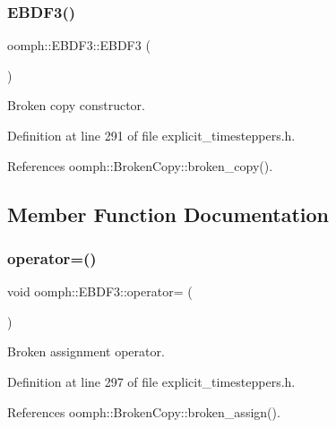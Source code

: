 \subsubsection{\texorpdfstring{E\+B\+D\+F3()}{EBDF3()}\hspace{0.1cm}{\footnotesize\ttfamily [2/2]}}
{\footnotesize\ttfamily oomph\+::\+E\+B\+D\+F3\+::\+E\+B\+D\+F3 (\begin{DoxyParamCaption}\item[{const \hyperlink{classoomph_1_1EBDF3}{E\+B\+D\+F3} \&}]{ }\end{DoxyParamCaption})\hspace{0.3cm}{\ttfamily [inline]}}



Broken copy constructor. 



Definition at line 291 of file explicit\+\_\+timesteppers.\+h.



References oomph\+::\+Broken\+Copy\+::broken\+\_\+copy().



\subsection{Member Function Documentation}
\mbox{\label{classoomph_1_1EBDF3_af2fe236410d490fa5a440c035a821c3a}} 
\subsubsection{\texorpdfstring{operator=()}{operator=()}}
{\footnotesize\ttfamily void oomph\+::\+E\+B\+D\+F3\+::operator= (\begin{DoxyParamCaption}\item[{const \hyperlink{classoomph_1_1EBDF3}{E\+B\+D\+F3} \&}]{ }\end{DoxyParamCaption})\hspace{0.3cm}{\ttfamily [inline]}}



Broken assignment operator. 



Definition at line 297 of file explicit\+\_\+timesteppers.\+h.



References oomph\+::\+Broken\+Copy\+::broken\+\_\+assign().

